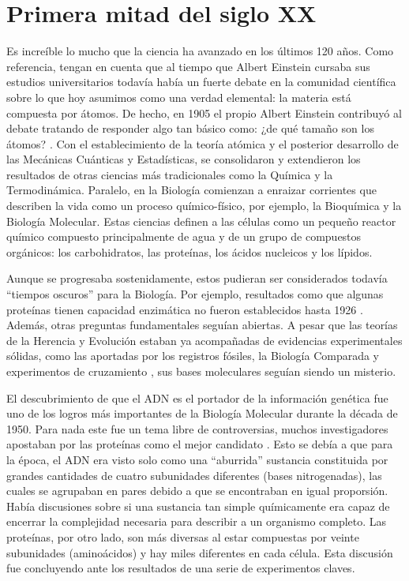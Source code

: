 \section{Primera mitad del siglo XX}

Es increíble lo mucho que la ciencia ha avanzado en los últimos 120 años.
Como referencia, tengan en cuenta que al tiempo que Albert Einstein cursaba sus estudios universitarios todavía había un fuerte debate en la comunidad científica sobre lo que hoy asumimos como una verdad elemental: la materia está compuesta por átomos.
De hecho, en 1905 el propio Albert Einstein contribuyó al debate tratando de responder algo tan básico como: ¿de qué tamaño son los átomos? \cite{einsteinEinsteinMiraculousYear2021}.
Con el establecimiento de la teoría atómica y el posterior desarrollo de las Mecánicas Cuánticas y Estadísticas, se consolidaron y extendieron los resultados de otras ciencias más tradicionales como la Química y la Termodinámica.
Paralelo, en la Biología comienzan a enraizar corrientes que describen la vida como un proceso químico-físico, por ejemplo, la Bioquímica y la Biología Molecular.
Estas ciencias definen a las células como un pequeño reactor químico compuesto principalmente de agua y de un grupo de compuestos orgánicos: los carbohidratos, las proteínas, los ácidos nucleicos y los lípidos.

Aunque se progresaba sostenidamente, estos pudieran ser considerados todavía ``tiempos oscuros'' para la Biología.
Por ejemplo, resultados como que algunas proteínas tienen capacidad enzimática no fueron establecidos hasta 1926 \cite{sumnerISOLATIONCRYSTALLIZATIONENZYME1926}.
Además, otras preguntas fundamentales seguían abiertas.
A pesar que las teorías de la Herencia y Evolución estaban ya acompañadas de evidencias experimentales sólidas, como las aportadas por los registros fósiles, la Biología Comparada y experimentos de cruzamiento \cite{darwinOriginSpeciesMeans1859, abbottExperimentsPlantHybrids2016a}, sus bases moleculares seguían siendo un misterio.
 
El descubrimiento de que el ADN es el portador de la información genética fue uno de los logros más importantes de la Biología Molecular durante la década de 1950.
Para nada este fue un tema libre de controversias, muchos investigadores apostaban por las proteínas como el mejor candidato \cite{griffithsIntroductionGeneticAnalysis2006}.
Esto se debía a que para la época, el ADN era visto solo como una ``aburrida'' sustancia constituida por grandes cantidades de cuatro subunidades diferentes (bases nitrogenadas), las cuales se agrupaban en pares debido a que se encontraban en igual proporsión.
Había discusiones sobre si una sustancia tan simple químicamente era capaz de encerrar la complejidad necesaria para describir a un organismo completo.
Las proteínas, por otro lado, son más diversas al estar compuestas por veinte subunidades (aminoácidos) y hay miles diferentes en cada célula.
Esta discusión fue concluyendo ante los resultados de una serie de experimentos claves.
 
